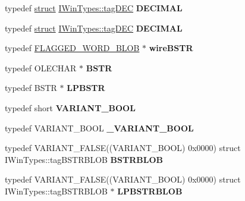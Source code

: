 \begin{DoxyCompactItemize}
\mbox{\label{interface_i_win_types_aa7f2b73e6ebafda3a3ac751475251461}} 
typedef \hyperlink{interfacestruct}{struct} \hyperlink{struct_i_win_types_1_1tag_d_e_c}{I\+Win\+Types\+::tag\+D\+EC} {\bfseries D\+E\+C\+I\+M\+AL}
\item 
\mbox{\label{interface_i_win_types_aa7f2b73e6ebafda3a3ac751475251461}} 
typedef \hyperlink{interfacestruct}{struct} \hyperlink{struct_i_win_types_1_1tag_d_e_c}{I\+Win\+Types\+::tag\+D\+EC} {\bfseries D\+E\+C\+I\+M\+AL}
\item 
\mbox{\label{interface_i_win_types_aff30c4fba9af322b77d01ceb71b4b43c}} 
typedef \hyperlink{struct_i_win_types_1_1___f_l_a_g_g_e_d___w_o_r_d___b_l_o_b}{F\+L\+A\+G\+G\+E\+D\+\_\+\+W\+O\+R\+D\+\_\+\+B\+L\+OB} $\ast$ {\bfseries wire\+B\+S\+TR}
\item 
\mbox{\label{interface_i_win_types_afa876a54997280d2019c2ba8946522bd}} 
typedef O\+L\+E\+C\+H\+AR $\ast$ {\bfseries B\+S\+TR}
\item 
\mbox{\label{interface_i_win_types_a47b3bf7b907292b887c53b76a16c0aa2}} 
typedef B\+S\+TR $\ast$ {\bfseries L\+P\+B\+S\+TR}
\item 
\mbox{\label{interface_i_win_types_a97919174c4b07fd442e5c18a2d54b83f}} 
typedef short {\bfseries V\+A\+R\+I\+A\+N\+T\+\_\+\+B\+O\+OL}
\item 
\mbox{\label{interface_i_win_types_abebd37ea1eb96afb45c092fc940de37a}} 
typedef V\+A\+R\+I\+A\+N\+T\+\_\+\+B\+O\+OL {\bfseries \+\_\+\+V\+A\+R\+I\+A\+N\+T\+\_\+\+B\+O\+OL}
\item 
\mbox{\label{interface_i_win_types_a40ae4e5dc43a51b6876d353b1f2bc0dc}} 
typedef V\+A\+R\+I\+A\+N\+T\+\_\+\+F\+A\+L\+SE((V\+A\+R\+I\+A\+N\+T\+\_\+\+B\+O\+OL) 0x0000) struct I\+Win\+Types\+::tag\+B\+S\+T\+R\+B\+L\+OB {\bfseries B\+S\+T\+R\+B\+L\+OB}
\item 
\mbox{\label{interface_i_win_types_a457d1cdd0fa8182d190a4f6bdebd7fff}} 
typedef V\+A\+R\+I\+A\+N\+T\+\_\+\+F\+A\+L\+SE((V\+A\+R\+I\+A\+N\+T\+\_\+\+B\+O\+OL) 0x0000) struct I\+Win\+Types\+::tag\+B\+S\+T\+R\+B\+L\+O\+B $\ast$ {\bfseries L\+P\+B\+S\+T\+R\+B\+L\+OB}

\end{DoxyCompactItemize}
